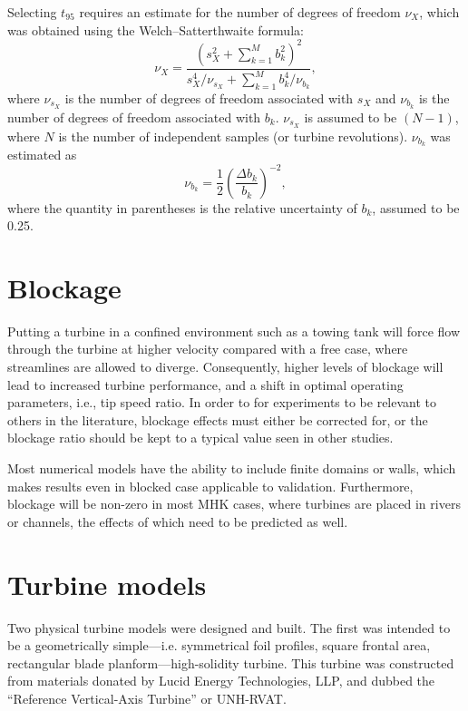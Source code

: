 Selecting $t_{95}$ requires an estimate for the number of degrees of freedom
$\nu_X$, which was obtained using the Welch--Satterthwaite formula:
\begin{equation}
    \nu_X = \frac{\left(s_X^2 + \sum_{k=1}^M b_k^2 \right)^2} {s_X^4/\nu_{s_X} +
    \sum_{k=1}^M b_k^4/\nu_{b_k}},
\end{equation}
where $\nu_{s_X}$ is the number of degrees of freedom associated with $s_X$ and
$\nu_{b_k}$ is the number of degrees of freedom associated with $b_k$.
$\nu_{s_X}$ is assumed to be $(N-1)$, where $N$ is the number of independent
samples (or turbine revolutions). $\nu_{b_k}$ was estimated as
\begin{equation}
    \nu_{b_k} = \frac{1}{2} \left( \frac{\Delta b_k}{b_k} \right)^{-2},
\end{equation}
where the quantity in parentheses is the relative uncertainty of $b_k$, assumed
to be 0.25.


\section{Blockage}

Putting a turbine in a confined environment such as a towing tank will force
flow through the turbine at higher velocity compared with a free case, where
streamlines are allowed to diverge. Consequently, higher levels of blockage will
lead to increased turbine performance, and a shift in optimal operating
parameters, i.e., tip speed ratio. In order to for experiments to be relevant to
others in the literature, blockage effects must either be corrected for, or the
blockage ratio should be kept to a typical value seen in other studies.

Most numerical models have the ability to include finite domains or walls, which
makes results even in blocked case applicable to validation. Furthermore,
blockage will be non-zero in most MHK cases, where turbines are placed in rivers
or channels, the effects of which need to be predicted as well.


\section{Turbine models}

Two physical turbine models were designed and built. The first was intended to
be a geometrically simple---i.e. symmetrical foil profiles, square frontal area,
rectangular blade planform---high-solidity turbine. This turbine was constructed
from materials donated by Lucid Energy Technologies, LLP, and dubbed the
``Reference Vertical-Axis Turbine'' or UNH-RVAT.

